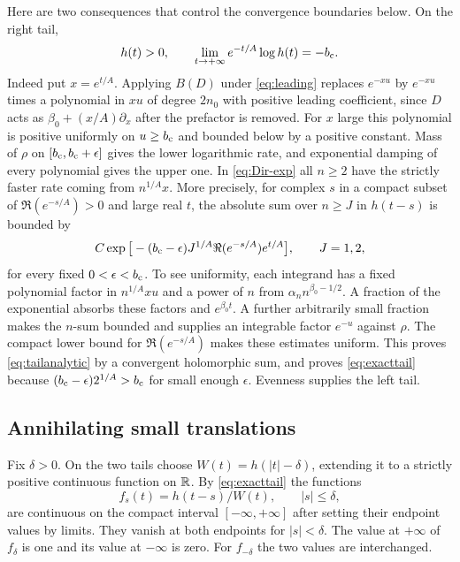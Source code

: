 Here are two consequences that control the convergence boundaries below. On the right tail,
\begin{equation}
 h(t)>0,\qquad
 \lim_{t\to+\infty} e^{-t/A}\log h(t)=-b_{\mathrm c} .             \label{eq:exacttail}
\end{equation}
Indeed put $x=e^{t/A}$. Applying $B(D)$ under \eqref{eq:leading} replaces $e^{-xu}$ by $e^{-xu}$ times a polynomial in $xu$ of degree $2n_0$ with positive leading coefficient, since $D$ acts as $\beta_0+(x/A)\partial_x$ after the prefactor is removed. For $x$ large this polynomial is positive uniformly on $u\ge b_{\mathrm c}$ and bounded below by a positive constant. Mass of $\rho$ on $[b_{\mathrm c},b_{\mathrm c}+\epsilon]$ gives the lower logarithmic rate, and exponential damping of every polynomial gives the upper one. In \eqref{eq:Dir-exp} all $n\ge2$ have the strictly faster rate coming from $n^{1/A}x$. More precisely, for complex $s$ in a compact subset of $\Re(e^{-s/A})>0$ and large real $t$, the absolute sum over $n\ge J$ in $h(t-s)$ is bounded by
\begin{equation}
 C\exp\big[-(b_{\mathrm c}-\epsilon)J^{1/A}\Re(e^{-s/A}) e^{t/A}\big],
 \qquad J=1,2,                                               \label{eq:tailanalytic}
\end{equation}
for every fixed $0<\epsilon<b_{\mathrm c}$. To see uniformity, each integrand has a fixed polynomial factor in $n^{1/A}xu$ and a power of $n$ from $\alpha_n n^{\beta_0-1/2}$. A fraction of the exponential absorbs these factors and $e^{\beta_0 t}$. A further arbitrarily small fraction makes the $n$-sum bounded and supplies an integrable factor $e^{-u}$ against $\rho$. The compact lower bound for $\Re(e^{-s/A})$ makes these estimates uniform. This proves \eqref{eq:tailanalytic} by a convergent holomorphic sum, and proves \eqref{eq:exacttail} because $(b_{\mathrm c}-\epsilon)2^{1/A}>b_{\mathrm c}$ for small enough $\epsilon$. Evenness supplies the left tail.

\subsection*{Annihilating small translations}
Fix $\delta>0$. On the two tails choose $W(t)=h(|t|-\delta)$, extending it to a strictly positive continuous function on $\mathbb R$. By \eqref{eq:exacttail} the functions
\[
       f_s(t)=h(t-s)/W(t),\qquad |s|\le\delta ,
\]
are continuous on the compact interval $[-\infty,+\infty]$ after setting their endpoint values by limits. They vanish at both endpoints for $|s|<\delta$. The value at $+\infty$ of $f_\delta$ is one and its value at $-\infty$ is zero. For $f_{-\delta}$ the two values are interchanged.

